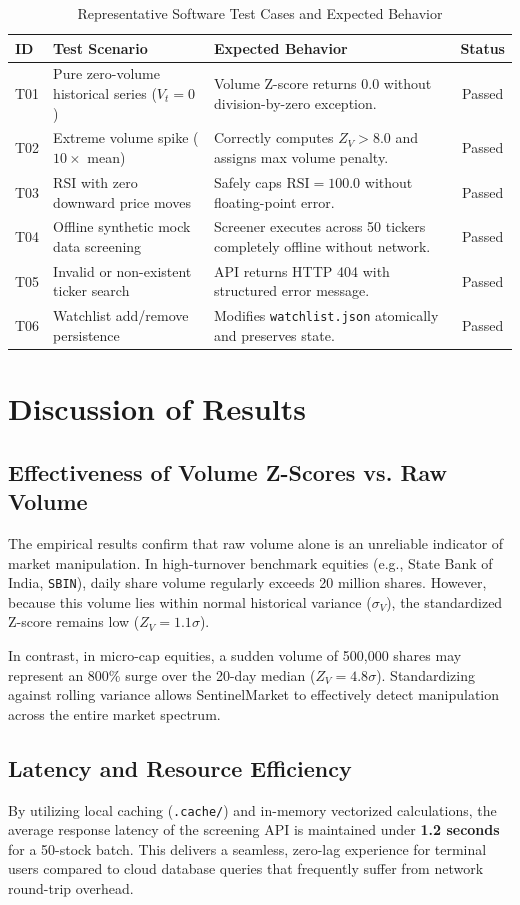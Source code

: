 \begin{table}[H]
\centering
\caption{Representative Software Test Cases and Expected Behavior}
\label{tab:representative_tests}
\begin{tabularx}{\textwidth}{@{}lXp{3.5cm}c@{}}
\toprule
\textbf{ID} & \textbf{Test Scenario} & \textbf{Expected Behavior} & \textbf{Status} \\
\midrule
T01 & Pure zero-volume historical series ($V_t = 0$) & Volume Z-score returns $0.0$ without division-by-zero exception. & Passed \\
T02 & Extreme volume spike ($10\times$ mean) & Correctly computes $Z_V > 8.0$ and assigns max volume penalty. & Passed \\
T03 & RSI with zero downward price moves & Safely caps $\text{RSI} = 100.0$ without floating-point error. & Passed \\
T04 & Offline synthetic mock data screening & Screener executes across 50 tickers completely offline without network. & Passed \\
T05 & Invalid or non-existent ticker search & API returns HTTP 404 with structured error message. & Passed \\
T06 & Watchlist add/remove persistence & Modifies \texttt{watchlist.json} atomically and preserves state. & Passed \\
\bottomrule
\end{tabularx}
\end{table}

\section{Discussion of Results}

\subsection{Effectiveness of Volume Z-Scores vs. Raw Volume}
The empirical results confirm that raw volume alone is an unreliable indicator of market manipulation. In high-turnover benchmark equities (e.g., State Bank of India, \texttt{SBIN}), daily share volume regularly exceeds 20 million shares. However, because this volume lies within normal historical variance ($\sigma_V$), the standardized Z-score remains low ($Z_V = 1.1\sigma$). 

In contrast, in micro-cap equities, a sudden volume of 500,000 shares may represent an 800\% surge over the 20-day median ($Z_V = 4.8\sigma$). Standardizing against rolling variance allows SentinelMarket to effectively detect manipulation across the entire market spectrum.

\subsection{Latency and Resource Efficiency}
By utilizing local caching (\texttt{.cache/}) and in-memory vectorized calculations, the average response latency of the screening API is maintained under \textbf{1.2 seconds} for a 50-stock batch. This delivers a seamless, zero-lag experience for terminal users compared to cloud database queries that frequently suffer from network round-trip overhead.
